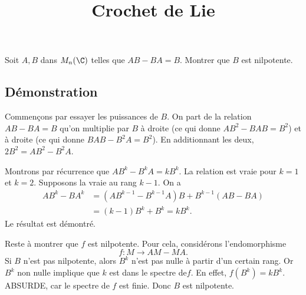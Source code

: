 \documentclass[fontsize=12pt,twoside=false,parskip=half, french]{scrartcl}
\title{Crochet de Lie}
\date{}
\author{}
\begin{document}
\maketitle
   \begin{Theoreme}
      Soit $A, B$ dans $M_n(\C)$ telles que $AB - BA = B$. Montrer que $B$ est nilpotente.
   \end{Theoreme}
   \subsection{Démonstration}
      Commençons par essayer les puissances de $B$. On part de la relation $AB - BA = B$ qu’on multiplie
      par $B$ à droite (ce qui donne $AB^2 - BAB = B^2$) et à droite (ce qui donne $BAB - B^2A = B^2$).
      En additionnant les deux, $2B^2 = AB^2 - B^2A$.

      Montrons par récurrence que $AB^k - B^kA = kB^k$. La relation est vraie pour $k = 1$ et $k = 2$.
      Supposons la vraie au rang $k -1$. On a
      \begin{align*}
         AB^k - BA^k &= (AB^{k - 1} - B^{k - 1}A)B + B^{k - 1}(AB - BA)\\
                     &= (k - 1)B^k + B^k = kB^k.
      \end{align*}
      Le résultat est démontré.

      Reste à montrer que $f$ est nilpotente. Pour cela, considérons l’endomorphisme
      \[
         f \colon M \to AM - MA.
      \]
      Si $B$ n’est pas nilpotente, alors $B^k$ n’est pas nulle à partir d’un certain rang. Or $B^k$ non nulle implique
      que $k$ est dans le spectre de$f$. En effet, $f(B^k) = kB^k$. ABSURDE, car le spectre de $f$ est finie.
      Donc $B$ est nilpotente.
\end{document}
